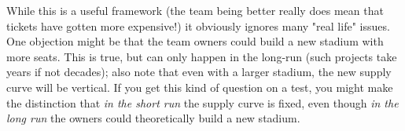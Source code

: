 \documentclass[12pt]{article}
\begin{document}
\medskip

While this is a useful framework (the team being better really does mean that tickets have gotten more expensive!) it obviously ignores many "real life" issues. One objection might be that the team owners could build a new stadium with more seats. This is true, but can only happen in the long-run (such projects take years if not decades); also note that even with a larger stadium, the new supply curve will be vertical. If you get this kind of question on a test, you might make the distinction that \textit{in the short run} the supply curve is fixed, even though \textit{in the long run} the owners could theoretically build a new stadium.
\end{document}

